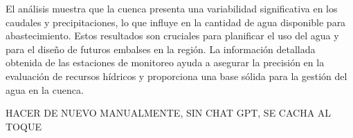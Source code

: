 \documentclass{article} %
\begin{document}
El análisis muestra que la cuenca presenta una variabilidad significativa en los caudales y precipitaciones, lo que influye en la cantidad de agua disponible para abastecimiento. Estos resultados son cruciales para planificar el uso del agua y para el diseño de futuros embalses en la región. La información detallada obtenida de las estaciones de monitoreo ayuda a asegurar la precisión en la evaluación de recursos hídricos y proporciona una base sólida para la gestión del agua en la cuenca.

HACER DE NUEVO MANUALMENTE, SIN CHAT GPT, SE CACHA AL TOQUE
\end{document}
